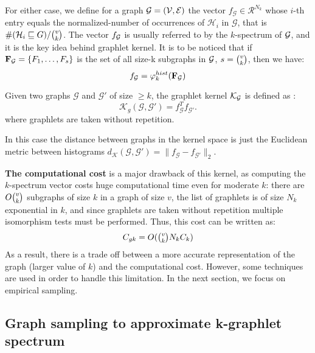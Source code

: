 For either case, we define for a graph $\mathcal{G}=(\mathcal{V},\mathcal{E})$ the vector $f_\mathcal{G}\in \mathcal{R}^{N_k}$ whose $i$-th entry equals the normalized-number of occurrences of $\mathcal{H}_i$ in $\mathcal{G}$, that is $\#(\mathcal{H}_i\sqsubseteq G)/\tbinom{v}{k}$. The vector $f_{\mathcal{G}}$ is usually referred to by the $k$-spectrum of $\mathcal{G}$, and it is the key idea behind graphlet kernel. It is to be noticed that if $\mathbf{F}_{\mathcal{G}}=\{F_1,\ldots,F_s\}$ is the set of all size-k subgraphs in $\mathcal{G}$, $s=\tbinom{v}{k}$, then we have:
\[
f_{\mathcal{G}}=\varphi_k^{hist}(\mathbf{F}_{\mathcal{G}})
\]
\begin{definition}
Given two graphs $\mathcal{G}$ and $\mathcal{G}'$ of size $\geq k$, the graphlet kernel $\mathcal{K}_{\mathcal{G}}$ is defined as \citep{graphlet_kernel}:
\begin{equation}
\label{eq:graphlet_kernel}
    \mathcal{K}_g(\mathcal{G},\mathcal{G}')=f_{\mathcal{G}}^Tf_{\mathcal{G}'}.
\end{equation}
where graphlets are taken without repetition.
\end{definition}
In this case the distance between graphs in the kernel space is just the Euclidean metric between histograms $d_\mathcal{K}({\mathcal{G}},{\mathcal{G}'}) = \|f_{\mathcal{G}} - f_{{\mathcal{G}'}}\|_2$.

\textbf{The computational cost} is a major drawback of this kernel, as computing the $k$-spectrum vector costs huge computational time even for moderate $k$: there are $O\tbinom{v}{k}$ subgraphs of size $k$ in a graph of size $v$, the list of graphlets is of size $N_k$ exponential in $k$, and since graphlets are taken without repetition multiple isomorphism tests must be performed. Thus, this cost can be written as:
\begin{equation}
\label{eq:cost_graphlet}
    C_{gk}= O(\tbinom{v}{k} N_k C_k)
\end{equation}
As a result, there is a trade off between a more accurate representation of the graph (larger value of $k$) and the computational cost. However, some techniques are used in order to handle this limitation. In the next section, we focus on empirical sampling.

\subsection{Graph sampling to approximate k-graphlet spectrum}
\label{graph_sampling}

